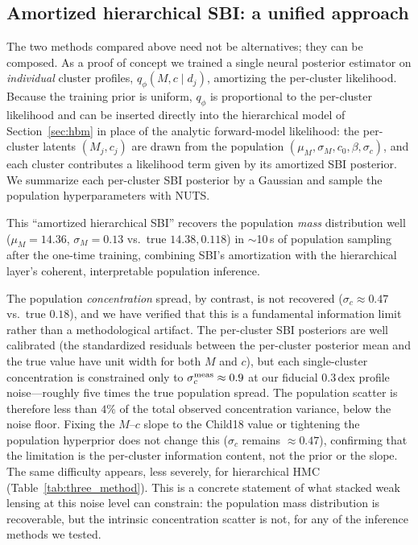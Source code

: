 \documentclass[11pt]{article}
\begin{document}
\subsection{Amortized hierarchical SBI: a unified approach}
\label{sec:amortized_hbi}

The two methods compared above need not be alternatives; they can be composed. As a proof of
concept we trained a single neural posterior estimator on \emph{individual} cluster profiles,
$q_\phi(M,c \mid d_j)$, amortizing the per-cluster likelihood. Because the training prior is
uniform, $q_\phi$ is proportional to the per-cluster likelihood and can be inserted directly into
the hierarchical model of Section~\ref{sec:hbm} in place of the analytic forward-model likelihood:
the per-cluster latents $(M_j,c_j)$ are drawn from the population $(\mu_M,\sigma_M,c_0,\beta,
\sigma_c)$, and each cluster contributes a likelihood term given by its amortized SBI posterior. We
summarize each per-cluster SBI posterior by a Gaussian and sample the population hyperparameters
with NUTS.

This ``amortized hierarchical SBI'' recovers the population \emph{mass} distribution well
($\mu_M=14.36$, $\sigma_M=0.13$ vs.\ true $14.38, 0.118$) in $\sim$10\,s of population sampling
after the one-time training, combining SBI's amortization with the hierarchical layer's coherent,
interpretable population inference.

The population \emph{concentration} spread, by contrast, is not recovered ($\sigma_c\approx0.47$
vs.\ true $0.18$), and we have verified that this is a fundamental information limit rather than a
methodological artifact. The per-cluster SBI posteriors are well calibrated (the standardized
residuals between the per-cluster posterior mean and the true value have unit width for both $M$
and $c$), but each single-cluster concentration is constrained only to $\sigma_c^{\rm meas}\approx
0.9$ at our fiducial $0.3$\,dex profile noise---roughly five times the true population spread. The
population scatter is therefore less than $4\%$ of the total observed concentration variance, below
the noise floor. Fixing the $M$--$c$ slope to the Child18 value or tightening the population
hyperprior does not change this ($\sigma_c$ remains $\approx0.47$), confirming that the limitation
is the per-cluster information content, not the prior or the slope. The same difficulty appears,
less severely, for hierarchical HMC (Table~\ref{tab:three_method}). This is a concrete statement of
what stacked weak lensing at this noise level can constrain: the population mass distribution is
recoverable, but the intrinsic concentration scatter is not, for any of the inference methods we
tested.
\end{document}
